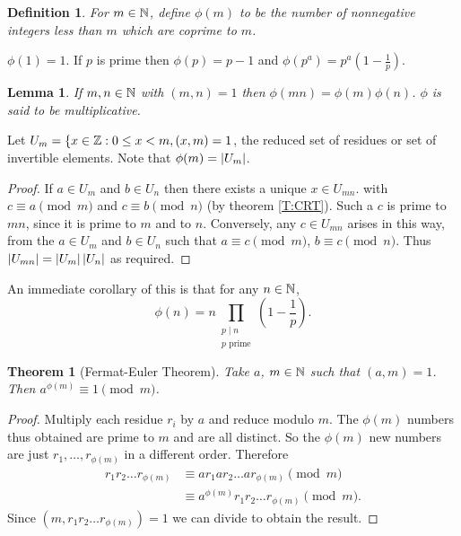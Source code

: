 \documentclass{notes}
\theoremstyle{plain}
\newtheorem{theorem}{Theorem}[chapter]
\newtheorem*{definition}{Definition}
\newtheorem{lemma}{Lemma}[chapter]
\begin{document}
\begin{definition}
For $m \in \mathbb{N}$, define $\phi(m)$ to be the number of nonnegative integers
less than $m$ which are coprime to $m$.
\end{definition}

$\phi(1) = 1$.  If $p$ is prime then $\phi(p) = p - 1$ and $\phi(p^a)
= p^a \left( 1 - \frac{1}{p} \right)$.

\begin{lemma}
If $m, n \in \mathbb{N}$ with $(m,n) = 1$ then $\phi(m n) = \phi(m) \phi(n)$.
$\phi$ is said to be multiplicative.
\end{lemma}

Let $U_m = \{ x \in \mathbb{Z} : 0 \le x < m, (x,m) = 1$, the reduced
set of residues or set of invertible elements.  Note that $\phi(m) =
\left|U_m\right|$.

\begin{proof}
If $a \in U_m$ and $b \in U_n$ then there exists a unique $x \in U_{mn}$.
with $c \equiv a \pmod{m}$ and $c \equiv b \pmod{n}$ (by theorem
\eqref{T:CRT}).  Such a $c$ is prime to $m n$, since it is prime to $m$
and to $n$.  Conversely, any $c \in U_{mn}$ arises in this way, from
the $a \in U_m$ and $b \in U_n$ such that $a \equiv c \pmod{m}$,
$b \equiv c \pmod{n}$.  Thus $\left|U_{mn}\right| = \left|U_m\right| \left|U_n\right|$
as required.
\end{proof}

An immediate corollary of this is that for any $n \in \mathbb{N}$,
\[
\phi(n) = n \prod_{\substack{p \mid n \\ p\text{ prime}}} \left( 1 - 
\frac{1}{p} \right).
\]

\begin{theorem}[Fermat-Euler Theorem]
  Take $a$, $m \in \mathbb{N}$ such that $(a,m) = 1$.  Then $a^{\phi(m)}
  \equiv 1 \pmod{m}$.
\end{theorem}

\begin{proof}
Multiply each residue $r_i$ by $a$ and reduce modulo $m$.  The $\phi(m)$
numbers thus obtained are prime to $m$ and are all distinct.  So
the $\phi(m)$ new numbers are just $r_1, \dots, r_{\phi(m)}$ in a different
order.  Therefore
\begin{align*}
r_1 r_2 \dots r_{\phi(m)} &\equiv a r_1 a r_2 \dots a r_{\phi(m)} \pmod{m} \\
&\equiv a^{\phi(m)} r_1 r_2 \dots r_{\phi(m)} \pmod{m}.
\end{align*}
Since $(m,r_1 r_2 \dots r_{\phi(m)}) = 1$ we can divide to obtain the result.
\end{proof}
\end{document}
